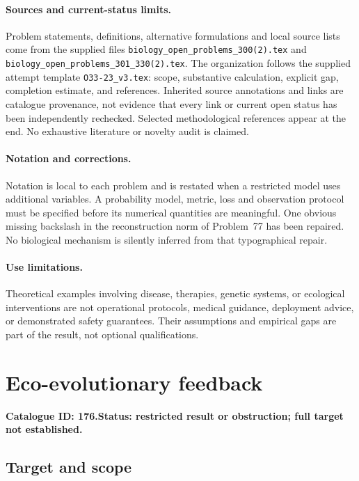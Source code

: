 \documentclass[11pt]{article}
\begin{document}
\paragraph{Sources and current-status limits.}
Problem statements, definitions, alternative formulations and local source lists
come from the supplied files
\texttt{biology\_open\_problems\_300(2).tex} and
\texttt{biology\_open\_problems\_301\_330(2).tex}.
The organization follows the supplied attempt template
\texttt{O33-23\_v3.tex}: scope, substantive calculation, explicit gap,
completion estimate, and references. Inherited source annotations and links are
catalogue provenance, not evidence that every link or current open status has
been independently rechecked. Selected methodological references appear at the
end. No exhaustive literature or novelty audit is claimed.

\paragraph{Notation and corrections.}
Notation is local to each problem and is restated when a restricted model uses
additional variables. A probability model, metric, loss and observation protocol
must be specified before its numerical quantities are meaningful. One obvious
missing backslash in the reconstruction norm of Problem~77 has been repaired.
No biological mechanism is silently inferred from that typographical repair.

\paragraph{Use limitations.}
Theoretical examples involving disease, therapies, genetic systems, or ecological
interventions are not operational protocols, medical guidance, deployment advice,
or demonstrated safety guarantees. Their assumptions and empirical gaps are part
of the result, not optional qualifications.

\setcounter{section}{175}
\section{Eco-evolutionary feedback}
\label{prob:176}
\noindent\textbf{Catalogue ID: 176.}\quad \textbf{Status: restricted result or obstruction; full target not established.}
\subsection{Target and scope}
\end{document}
